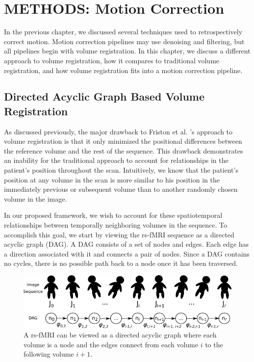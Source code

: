 \chapter{METHODS: Motion Correction}
\label{ch:moco}

In the previous chapter, we discussed several techniques used to retrospectively correct motion. Motion correction pipelines may use denoising and filtering, but all pipelines begin with volume registration. In this chapter, we discuss a different approach to volume registration, how it compares to traditional volume registration, and how volume registration fits into a motion correction pipeline. 

\section{Directed Acyclic Graph Based Volume Registration}

As discussed previously, the major drawback to Friston et al. 's approach to volume registration is that it only minimized the positional differences between the reference volume and the rest of the sequence. This drawback demonstrates an inability for the traditional approach to account for relationships in the patient's position throughout the scan. Intuitively, we know that the patient's position at any volume in the scan is more similar to his position in the immediately previous or subsequent volume than to another randomly chosen volume in the image.

In our proposed framework, we wish to account for these spatiotemporal relationships between temporally neighboring volumes in the sequence. To accomplish this goal, we start by viewing the rs-fMRI sequence as a directed acyclic graph (DAG). A DAG consists of a set of nodes and edges. Each edge has a direction associated with it and connects a pair of nodes. Since a DAG contains no cycles, there is no possible path back to a node once it has been traversed. 

\begin{figure}
\centering
\includegraphics[width=.7\textwidth]{3/dag-chain.png}
\caption{A rs-fMRI can be viewed as a directed acyclic graph where each volume is a node and the edges connect from each volume $i$ to the following volume $i+1$.}
\label{ch3:fig:dag-chain}
\end{figure}

